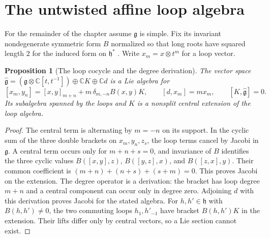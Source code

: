 \documentclass[11pt,oneside,openany]{book}
\newtheorem{proposition}[theorem]{Proposition}
\theoremstyle{definition}
\theoremstyle{remark}
\begin{document}
\section{The untwisted affine loop algebra}

For the remainder of the chapter assume \(\mathfrak g\) is simple.
Fix its invariant nondegenerate symmetric form \(B\) normalized so
that long roots have squared length \(2\) for the induced form on
\(\mathfrak h^*\) \cite[Results B06 and D02--D05, PDF pp.~15,
23--25]{mg-lie}. Write \(x_m=x\otimes t^m\) for a loop vector.

\begin{proposition}[The loop cocycle and the degree derivation]
\label{res:LO09}
The vector space
\(\widehat{\mathfrak g}=
(\mathfrak g\otimes\mathbb C[t,t^{-1}])\oplus\mathbb C K\oplus\mathbb C d\)
is a Lie algebra for
\[
 [x_m,y_n]=[x,y]_{m+n}+m\,\delta_{m,-n}B(x,y)K,\qquad
 [d,x_m]=m x_m,\qquad [K,\widehat{\mathfrak g}]=0 .
\]
Its subalgebra spanned by the loops and \(K\) is a nonsplit
central extension of the loop algebra.
\end{proposition}
\begin{proof}
The central term is alternating by \(m=-n\) on its support.
In the cyclic sum of the three double brackets on \(x_m,y_n,z_s\),
the loop terms cancel by Jacobi in \(\mathfrak g\). A central term
occurs only for \(m+n+s=0\), and invariance of \(B\) identifies
the three cyclic values \(B([x,y],z)\), \(B([y,z],x)\),
and \(B([z,x],y)\). Their common coefficient is
\((m+n)+(n+s)+(s+m)=0\). This proves Jacobi on the extension.
The degree operator is a derivation: the bracket has loop
degree \(m+n\) and a central component can occur only in
degree zero. Adjoining \(d\) with this derivation proves
Jacobi for the stated algebra.
For \(h,h'\in\mathfrak h\) with \(B(h,h')\ne0\), the two
commuting loops \(h_1,h'_{-1}\) have bracket \(B(h,h')K\)
in the extension. Their lifts differ only by central
vectors, so a Lie section cannot exist.
\end{proof}
\end{document}
